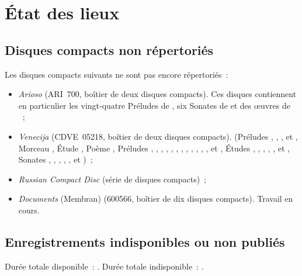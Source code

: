 \chapter[%
État des lieux][%
État des lieux]{%
État des lieux}
\label{chap:Etat-des-lieux}

\section{Disques compacts non répertoriés}
\label{sec:Nonrepertorie}

Les disques compacts suivants ne sont pas encore répertoriés~:
\begin{itemize}
 \item
 \emph{Arioso} (ARI~700, boîtier de deux disques compacts).
 Ces disques contiennent en particulier les vingt-quatre Préludes 
 de \Chopin{}, six Sonates de \Scriabine{} et des œuvres de \Liadov{}~;
 \item
 \emph{Venecija} (CDVE~05218, boîtier de deux disques compacts).
 \Scriabine{} (Préludes  ,  ,
  ,   et  ,
 Morceau  , Étude  , Poème 
 , Préludes  ,  , 
 ,  ,  , 
 ,  ,  , 
 ,  ,  , 
 ,   et  , Études
  ,  ,  , 
 ,  ,   et 
 , Sonates , , , , ,
  et )~;
 \item
 \emph{Russian Compact Disc} (série de disques compacts)~;
 \item
 \emph{Documents} (Membran) (600566, boîtier de dix disques compacts).
 Travail en cours.
\end{itemize}

\section{Enregistrements indisponibles ou non publiés}
\label{sec:IndisponibleNonpublie}

Durée totale disponible~: \availabletotaltime.
Durée totale indisponible~: \unavailabletotaltime.
